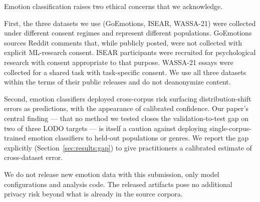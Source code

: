 
Emotion classification raises two ethical concerns that we acknowledge.

First, the three datasets we use (GoEmotions, ISEAR, WASSA-21) were
collected under different consent regimes and represent different
populations. GoEmotions sources Reddit comments that, while publicly
posted, were not collected with explicit ML-research consent. ISEAR
participants were recruited for psychological research with consent
appropriate to that purpose. WASSA-21 essays were collected for a
shared task with task-specific consent. We use all three datasets
within the terms of their public releases and do not deanonymize
content.

Second, emotion classifiers deployed cross-corpus risk surfacing
distribution-shift errors as predictions, with the appearance of
calibrated confidence. Our paper's central finding — that no method we
tested closes the validation-to-test gap on two of three LODO targets
— is itself a caution against deploying single-corpus-trained emotion
classifiers to held-out populations or genres. We report the gap
explicitly (Section~\ref{sec:results:gap}) to give practitioners a
calibrated estimate of cross-dataset error.

We do not release new emotion data with this submission, only model
configurations and analysis code. The released artifacts pose no
additional privacy risk beyond what is already in the source corpora.
